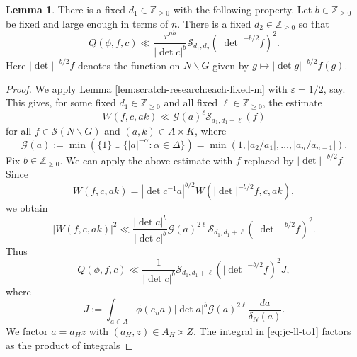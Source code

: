 \documentclass[reqno]{amsart}
\def\eps{\varepsilon}
\theoremstyle{plain} \newtheorem{theorem} {Theorem}
\theoremstyle{definition} \newtheorem{definition} [theorem] {Definition}
\theoremstyle{itplain} %
\newtheorem{lemma}[theorem]{Lemma}
\numberwithin{equation}{section}
\numberwithin{theorem}{section}
\renewcommand{\geq}{\geqslant}
\begin{document}
\begin{lemma}\label{lem:sub-gln:there-fixed-x}
  There is a fixed $d_1 \in \mathbb{Z}_{\geq 0}$ with the following property.  Let $b \in \mathbb{Z}_{\geq 0}$ be fixed and large enough in terms of $n$.  There is a fixed $d_2 \in \mathbb{Z}_{\geq 0}$ so that
  \begin{equation*}
    Q(\phi,f,c)
    \ll
    \frac{r^{n b}}{|\det c|^b}
    \mathcal{S}_{d_1,d_2} ( |\det|^{-b/2} f)^2.
  \end{equation*}
  Here $|\det|^{-b/2} f$ denotes the function on $N \backslash G$ given by $g \mapsto |\det g|^{-b/2} f(g)$.
\end{lemma}
\begin{proof}
  We apply Lemma \ref{lem:scratch-research:each-fixed-m} with $\eps = 1/2$, say.  This gives, for some fixed $d_1 \in \mathbb{Z}_{\geq 0}$ and all fixed $\ell \in \mathbb{Z}_{\geq 0}$, the estimate
  \begin{equation*}
    W(f,c,a k) \ll \mathcal{G}(a)^{\ell} \mathcal{S}_{d_1, d_1+\ell}(f)
  \end{equation*}
  for all $f \in \mathcal{S}(N \backslash G)$ and $(a,k) \in A \times K$, where
  \begin{equation*}
    \mathcal{G}(a) := \min(\{1\} \cup \{|a|^{-\alpha} : \alpha \in \Delta \})
    =
    \min(1, |a_2/a_1|, \dotsc, |a_n / a_{n-1}|).
  \end{equation*}
  Fix $b \in \mathbb{Z}_{\geq 0}$.  We can apply the above estimate with $f$ replaced by $|\det|^{-b/2} f$.   Since
  \begin{equation*}
    W(f,c, a k)
    =
    |\det c^{-1} a|^{b/2}
    W(|\det|^{-b/2} f, c, a k),
  \end{equation*}
  we obtain
  \begin{equation}\label{eq:wf-c-k2}
    |W(f, c, a k)|^2 \ll
    \frac{|\det a|^{b}}{|\det c|^b}
    \mathcal{G}(a)^{2 \ell} \mathcal{S}_{d_1, d_1 + \ell} ( |\det|^{-b/2} f)^2.
  \end{equation}
  Thus
  \begin{equation*}
    Q(\phi,f,c) \ll
    \frac{1}{|\det c|^b}
    \mathcal{S}_{d_1, d_1 + \ell} ( |\det|^{-b/2} f)^2
    J,
  \end{equation*}
  where
  \begin{equation}\label{eq:jc-ll-to1}
    J := \int _{a \in A}
    \phi(e_n a)
    |\det a|^b
    \mathcal{G}(a)^{2 \ell}
    \frac{d a}{\delta_N(a)}.
  \end{equation}
  We factor $a = a_H z$ with $(a_H,z)  \in A_H \times Z$.  The integral in \eqref{eq:jc-ll-to1} factors as the product of integrals

\end{proof}
\end{document}
